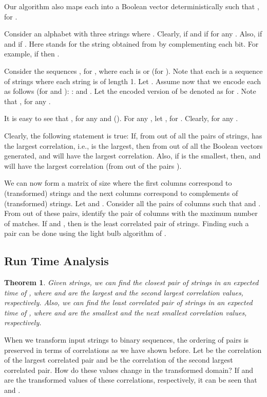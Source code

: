 \documentclass{article}
\newtheorem{theorem}{Theorem}[section]
\theoremstyle{definition}
\theoremstyle{remark}
\begin{document}
 Our algorithm also maps each  into a Boolean vector  deterministically such that , for .

 Consider an alphabet  with three strings where . Clearly,  if  and  if  for any . Also,  if  and  if . Here  stands for the string obtained from  by complementing each bit. For example, if  then .

 Consider the sequences , for , where each  is  or  (for ). Note that each  is a sequence of strings where each string is of length 1. Let . Assume now that we encode each  as follows (for  and ): : and . Let the encoded version of  be denoted as  for . Note that , for any .

 It is easy to see that , for any  and  (). For any , let , for . Clearly,  for any .

Clearly, the following statement is true: If, from out of all the pairs of strings,  has the largest correlation, i.e.,  is the largest, then from out of all the Boolean vectors generated,  and  will have the largest correlation. Also, if  is the smallest, then,  and  will have the largest correlation (from out of the pairs ).

 We can now form a matrix  of size  where the first  columns correspond to (transformed) strings and the next  columns correspond to complements of (transformed) strings. Let  and .  Consider all the pairs of columns  such that  and . From out of these pairs, identify the pair  of columns with the maximum number of matches.  If  and , then  is the least correlated pair of strings. Finding such a pair  can be done using the light bulb algorithm of \cite{RSJ89}.

 \subsection{Run Time Analysis}\label{mapanalysis}
\begin{theorem}\label{theorem1}
 Given  strings, we can find the closest pair of strings in an expected time of , where  and  are the largest and the second largest correlation values, respectively. Also, we can find the least correlated pair of strings in an expected time of \protect\linebreak , where  and  are the smallest and the next smallest correlation values, respectively.
 \end{theorem}

 When we transform input strings to binary sequences, the ordering of pairs is preserved in terms of correlations as we have shown before. Let  be the correlation of the largest correlated pair and  be the correlation of the second largest correlated pair. How do these values change in the transformed domain? If  and  are the transformed values of these correlations, respectively, it can be seen that  and .
\end{document}

